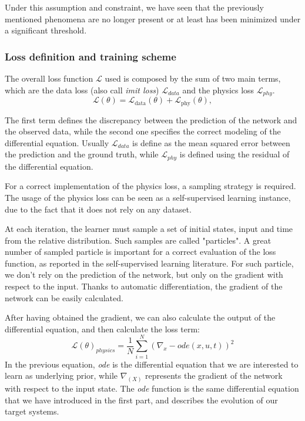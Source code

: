 Under this assumption and constraint, we have seen that the previously mentioned phenomena are no longer present or at least has been minimized under a significant threshold.

\subsubsection{Loss definition and training scheme}

The overall loss function $\mathcal{L}$ used is composed by the sum of two main terms, which are the data loss (also call \textit{imit loss}) $\mathcal{L}_{data}$ and the physics loss $\mathcal{L}_{phy}$. 
\begin{equation}
    \mathcal{L}(\theta) = \mathcal{L}_{\text{data}}(\theta) + \mathcal{L}_{\text{phy}}(\theta),
\end{equation}

The first term defines the discrepancy between the prediction of the network and the observed data, while the second one specifies the correct modeling of the differential equation.
Usually $\mathcal{L}_{data}$ is define as the mean squared error between the prediction and the ground truth, while $\mathcal{L}_{phy}$ is defined using the residual of the differential equation.

For a correct implementation of the physics loss, a sampling strategy is required. The usage of the physics loss can be seen as a self-supervised learning instance, due to the fact that it does not rely on any dataset.

At each iteration, the learner must sample a set of initial states, input and time from the relative distribution. Such samples are called "particles". 
A great number of sampled particle is important for a correct evaluation of the loss function, as reported in the self-supervised learning literature. 
For such particle, we don't rely on the prediction of the network, but only on the gradient with respect to the input. Thanks to automatic differentiation, the gradient of the network can be easily calculated.

After having obtained the gradient, we can also calculate the output of the differential equation, and then calculate the loss term:
\begin{equation}
    \mathcal L(\theta)_{physics} = \frac{1}{N} \sum_{i=1}^{N} (\nabla_{x} -  \textit{ode}(x, u, t) )^2
\end{equation}
In the previous equation, \textit{ode} is the differential equation that we are interested to learn as underlying prior, while $\nabla_(X)$ represents the gradient of the network with respect to the input state.
The \textit{ode} function is the same differential equation that we have introduced in the first part, and describes the evolution of our target systems.
\\

